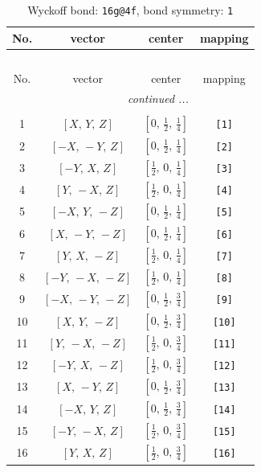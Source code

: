 \documentclass[fleqn,8pt]{jsarticle}
\begin{document}
\begin{longtable}{cccc}
\caption{Wyckoff bond: {\tt 16g@4f}, bond symmetry: {\tt 1}}
 \\
 \hline \hline
No. & vector & center & mapping \\ \hline \endfirsthead

\multicolumn{3}{l}{\tablename\ \thetable{}} \\
 \hline \hline
No. & vector & center & mapping \\ \hline \endhead

 \hline \hline
\multicolumn{3}{r}{\footnotesize\it continued ...} \\ \endfoot

 \hline \hline
\multicolumn{3}{r}{} \\ \endlastfoot

1 & $\left[ X,\, Y,\, Z \right]$ & $\left[ 0,\, \frac{1}{2},\, \frac{1}{4} \right]$ & {\tt [1]} \\ \hline
2 & $\left[ - X,\, - Y,\, Z \right]$ & $\left[ 0,\, \frac{1}{2},\, \frac{1}{4} \right]$ & {\tt [2]} \\ \hline
3 & $\left[ - Y,\, X,\, Z \right]$ & $\left[ \frac{1}{2},\, 0,\, \frac{1}{4} \right]$ & {\tt [3]} \\ \hline
4 & $\left[ Y,\, - X,\, Z \right]$ & $\left[ \frac{1}{2},\, 0,\, \frac{1}{4} \right]$ & {\tt [4]} \\ \hline
5 & $\left[ - X,\, Y,\, - Z \right]$ & $\left[ 0,\, \frac{1}{2},\, \frac{1}{4} \right]$ & {\tt [5]} \\ \hline
6 & $\left[ X,\, - Y,\, - Z \right]$ & $\left[ 0,\, \frac{1}{2},\, \frac{1}{4} \right]$ & {\tt [6]} \\ \hline
7 & $\left[ Y,\, X,\, - Z \right]$ & $\left[ \frac{1}{2},\, 0,\, \frac{1}{4} \right]$ & {\tt [7]} \\ \hline
8 & $\left[ - Y,\, - X,\, - Z \right]$ & $\left[ \frac{1}{2},\, 0,\, \frac{1}{4} \right]$ & {\tt [8]} \\ \hline
9 & $\left[ - X,\, - Y,\, - Z \right]$ & $\left[ 0,\, \frac{1}{2},\, \frac{3}{4} \right]$ & {\tt [9]} \\ \hline
10 & $\left[ X,\, Y,\, - Z \right]$ & $\left[ 0,\, \frac{1}{2},\, \frac{3}{4} \right]$ & {\tt [10]} \\ \hline
11 & $\left[ Y,\, - X,\, - Z \right]$ & $\left[ \frac{1}{2},\, 0,\, \frac{3}{4} \right]$ & {\tt [11]} \\ \hline
12 & $\left[ - Y,\, X,\, - Z \right]$ & $\left[ \frac{1}{2},\, 0,\, \frac{3}{4} \right]$ & {\tt [12]} \\ \hline
13 & $\left[ X,\, - Y,\, Z \right]$ & $\left[ 0,\, \frac{1}{2},\, \frac{3}{4} \right]$ & {\tt [13]} \\ \hline
14 & $\left[ - X,\, Y,\, Z \right]$ & $\left[ 0,\, \frac{1}{2},\, \frac{3}{4} \right]$ & {\tt [14]} \\ \hline
15 & $\left[ - Y,\, - X,\, Z \right]$ & $\left[ \frac{1}{2},\, 0,\, \frac{3}{4} \right]$ & {\tt [15]} \\ \hline
16 & $\left[ Y,\, X,\, Z \right]$ & $\left[ \frac{1}{2},\, 0,\, \frac{3}{4} \right]$ & {\tt [16]} \\
\end{longtable}
\end{document}
